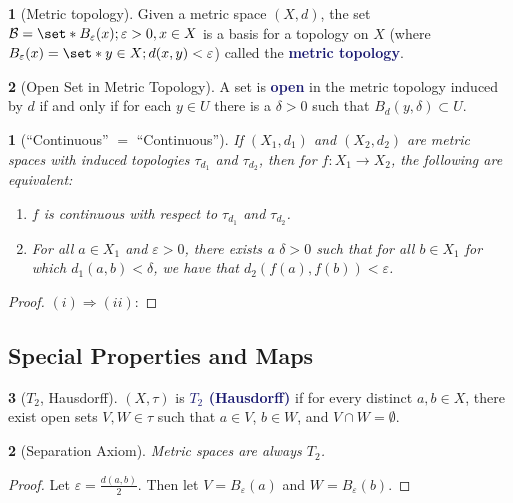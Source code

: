 \documentclass[11pt]{article}
\numberwithin{equation}{section}
\newcommand{\navy}[1]{\textcolor{MidnightBlue}{\bf #1}}
\theoremstyle{plain}
\newtheorem{theorem}{\color{ForestGreen}{\textbf{Theorem}}}[section]
\theoremstyle{definition}
\newtheorem{definition}{\color{MidnightBlue}{\textbf{Definition}}}[section]
\def\Set{\set*}%
\def\ss{\subset}
\def\imp{\Rightarrow}
\newcommand{\1}{\mathbbm 1}
\def\d{\delta}
\def\t{\tau}
\newcommand{\e}{\varepsilon}
\newcommand{\bB}{\mathcal B}
\begin{document}
\begin{definition}[Metric topology]
	Given a metric space $(X,d)$, the set $\bB = \Set{B_\e(x); \e > 0, x \in X}$ is a basis for a topology on $X$ (where $B_\e(x) = \Set{y \in X; d(x,y) < \e}$) called the \navy{metric topology}.
\end{definition}

\begin{definition}[Open Set in Metric Topology]
	A set is \navy{open} in the metric topology induced by $d$ if and only if for each $y \in U$ there is a $\d > 0$ such that $B_d(y, \d) \ss U$.
\end{definition}




\begin{theorem}[``Continuous'' $=$ ``Continuous'']
	If $(X_1,d_1)$ and $(X_2,d_2)$ are metric spaces with induced topologies $\t_{d_1}$ and $\t_{d_2}$, then for $f: X_1 \to X_2$, the following are equivalent:
	\begin{enumerate}
		\item $f$ is continuous with respect to $\t_{d_1}$ and $\t_{d_2}$.
		\item For all $a \in X_1$ and $\e > 0$, there exists a $\d > 0$ such that for all $b \in X_1$ for which $d_1(a,b) < \d$, we have that $d_2(f(a),f(b)) < \e$. 
	\end{enumerate}
\end{theorem}
\begin{proof} 
	$(i) \imp (ii)$:
	
\end{proof}

\subsection{Special Properties and Maps}

\begin{definition}[$T_2$, Hausdorff]
	$(X,\t)$ is \navy{$T_2$ (Hausdorff)} if for every distinct $a,b \in X$, there exist open sets $V,W \in \t$ such that $a \in V$, $b \in W$, and $V \cap W = \emptyset$.
\end{definition}

\begin{theorem}[Separation Axiom]
	Metric spaces are always $T_2$. 
\end{theorem}
\begin{proof}
	Let $\e = \frac{d(a,b)}{2}$. Then let $V=B_\e(a)$ and $W = B_\e (b)$.
\end{proof}
\end{document}
